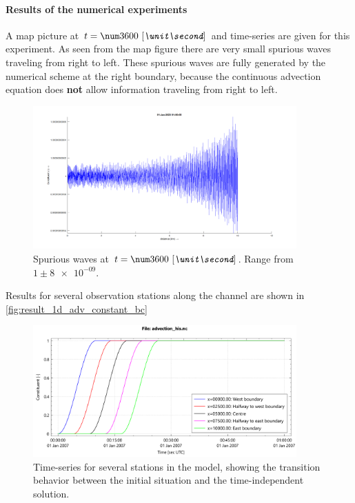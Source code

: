 \paragraph*{Results of the numerical experiments}
A map picture at $t=\bqty{3600}{\second}$ and time-series are given for this experiment.
As seen from the map figure there are very small spurious waves traveling from right to left.
These spurious waves are fully generated by the numerical scheme at the right boundary,
because the continuous advection equation does \textbf{not} allow information traveling from right to left.
\begin{figure}[H]
    \centering
    \includegraphics[width=0.9\textwidth]{figures/constant_3600s.png}
    \caption{Spurious waves at $t=\bqty{3600}{\second}$. Range from $ 1 \pm \num{8e-09}$.}
\end{figure}
Results for several observation stations along the channel are shown in \autoref{fig:result_1d_adv_constant_bc}
\begin{figure}[H]
    \centering
    \includegraphics[width=0.9\textwidth]{figures/time-series-advection-constant.pdf}
    \caption{Time-series for several stations in the model, showing the transition behavior between the initial situation and the time-independent solution.}
    \label{fig:result_1d_adv_constant_bc}
\end{figure}
